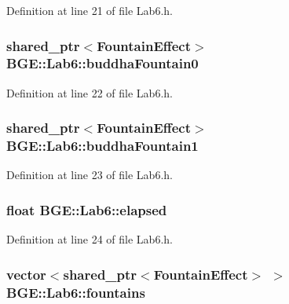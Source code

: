 Definition at line 21 of file Lab6.\-h.

\hypertarget{class_b_g_e_1_1_lab6_a444f347fd43e8bc345d99f034d8db05a}{
\subsubsection[{buddha\-Fountain0}]{\setlength{\rightskip}{0pt plus 5cm}shared\-\_\-ptr$<${\bf Fountain\-Effect}$>$ B\-G\-E\-::\-Lab6\-::buddha\-Fountain0}}\label{class_b_g_e_1_1_lab6_a444f347fd43e8bc345d99f034d8db05a}


Definition at line 22 of file Lab6.\-h.

\hypertarget{class_b_g_e_1_1_lab6_a178f618b743064b6f742cd73315d1e40}{
\subsubsection[{buddha\-Fountain1}]{\setlength{\rightskip}{0pt plus 5cm}shared\-\_\-ptr$<${\bf Fountain\-Effect}$>$ B\-G\-E\-::\-Lab6\-::buddha\-Fountain1}}\label{class_b_g_e_1_1_lab6_a178f618b743064b6f742cd73315d1e40}


Definition at line 23 of file Lab6.\-h.

\hypertarget{class_b_g_e_1_1_lab6_a6875058e98814ad42d46e1d05de66c51}{
\subsubsection[{elapsed}]{\setlength{\rightskip}{0pt plus 5cm}float B\-G\-E\-::\-Lab6\-::elapsed}}\label{class_b_g_e_1_1_lab6_a6875058e98814ad42d46e1d05de66c51}


Definition at line 24 of file Lab6.\-h.

\hypertarget{class_b_g_e_1_1_lab6_a907686a8012ec6c836e77dc904977feb}{
\subsubsection[{fountains}]{\setlength{\rightskip}{0pt plus 5cm}vector$<$shared\-\_\-ptr$<${\bf Fountain\-Effect}$>$ $>$ B\-G\-E\-::\-Lab6\-::fountains}}\label{class_b_g_e_1_1_lab6_a907686a8012ec6c836e77dc904977feb}



